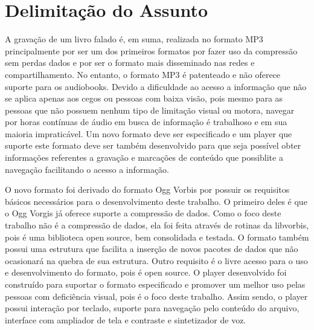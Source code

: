 \section{Delimitação do Assunto}

A gravação de um livro falado é, em suma, realizada no formato MP3 principalmente por ser um dos primeiros formatos por fazer uso da compressão sem perdas dados e por ser o formato mais disseminado nas redes e compartilhamento. No entanto, o formato MP3 é patenteado e não oferece suporte para os audiobooks. Devido a dificuldade ao acesso a informação que não se aplica apenas aos cegos ou pessoas com baixa visão, pois mesmo para as pessoas que não possuem nenhum tipo de limitação visual ou motora, navegar por horas contínuas de áudio em busca de informação é trabalhoso e em sua maioria impraticável. Um novo formato deve ser especificado e um player que suporte este formato deve ser também desenvolvido para que seja possível obter informações referentes a gravação e marcações de conteúdo que possiblite a navegação facilitando o acesso a informação.

O novo formato foi derivado do formato Ogg Vorbis por possuir os requisitos básicos necessários para o desenvolvimento deste trabalho. O primeiro deles é que o Ogg Vorgis já oferece suporte a compressão de dados. Como o foco deste trabalho não é a compressão de dados, ela foi feita através de rotinas da libvorbis, pois é uma biblioteca open source, bem consolidada e testada. O formato também possui uma estrutura que facilita a inserção de novos pacotes de dados que não ocasionará na quebra de sua estrutura. Outro requisito é o livre acesso para o uso e desenvolvimento do formato, pois é open source. O player desenvolvido foi construído para suportar o formato especificado e promover um melhor uso pelas pessoas com deficiência visual, pois é o foco deste trabalho. Assim sendo, o player possui interação por teclado, suporte para navegação pelo conteúdo do arquivo, interface com ampliador de tela e contraste e sintetizador de voz. 



